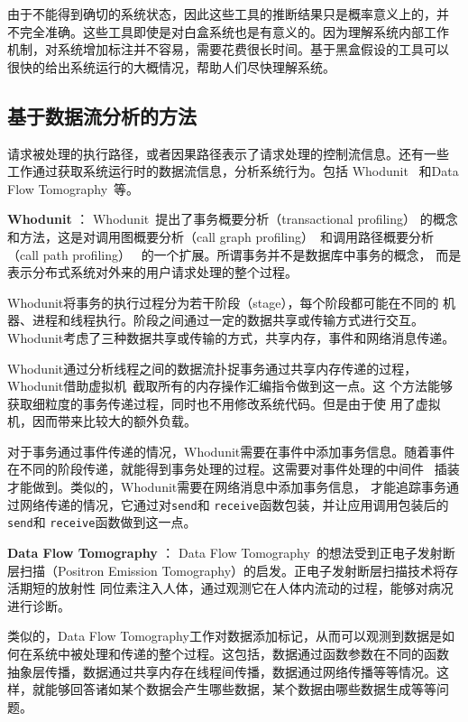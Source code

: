 由于不能得到确切的系统状态，因此这些工具的推断结果只是概率意义上的，并
不完全准确。这些工具即使是对白盒系统也是有意义的。因为理解系统内部工作
机制，对系统增加标注并不容易，需要花费很长时间。基于黑盒假设的工具可以
很快的给出系统运行的大概情况，帮助人们尽快理解系统。

\subsection{基于数据流分析的方法}
\label{related:debug:dataflow}

请求被处理的执行路径，或者因果路径表示了请求处理的控制流信息。还有一些
工作通过获取系统运行时的数据流信息，分析系统行为。包括
Whodunit~\cite{whodunit} 和Data Flow Tomography~\cite{dft}等。

\textbf{Whodunit} ：
Whodunit~\cite{whodunit}提出了事务概要分析（transactional profiling）
的概念和方法，这是对调用图概要分析（call graph
profiling）~\cite{Graham2004}和调用路径概要分析（call path profiling）~
\cite{Hall1992, Hall1993}的一个扩展。所谓事务并不是数据库中事务的概念，
而是表示分布式系统对外来的用户请求处理的整个过程。

Whodunit将事务的执行过程分为若干阶段（stage），每个阶段都可能在不同的
机器、进程和线程执行。阶段之间通过一定的数据共享或传输方式进行交互。
Whodunit考虑了三种数据共享或传输的方式，共享内存，事件和网络消息传递。

Whodunit通过分析线程之间的数据流扑捉事务通过共享内存传递的过程，
Whodunit借助虚拟机~\cite{qemu}截取所有的内存操作汇编指令做到这一点。这
个方法能够获取细粒度的事务传递过程，同时也不用修改系统代码。但是由于使
用了虚拟机，因而带来比较大的额外负载。

对于事务通过事件传递的情况，Whodunit需要在事件中添加事务信息。随着事件
在不同的阶段传递，就能得到事务处理的过程。这需要对事件处理的中间件
~\cite{seda}插装才能做到。类似的，Whodunit需要在网络消息中添加事务信息，
才能追踪事务通过网络传递的情况，它通过对\texttt{send}和
\texttt{receive}函数包装，并让应用调用包装后的\texttt{send}和
\texttt{receive}函数做到这一点。

\textbf{Data Flow Tomography} ：
Data Flow Tomography~\cite{dft}的想法受到正电子发射断层扫描（Positron
Emission Tomography）的启发。正电子发射断层扫描技术将存活期短的放射性
同位素注入人体，通过观测它在人体内流动的过程，能够对病况进行诊断。

类似的，Data Flow Tomography工作对数据添加标记，从而可以观测到数据是如
何在系统中被处理和传递的整个过程。这包括，数据通过函数参数在不同的函数
抽象层传播，数据通过共享内存在线程间传播，数据通过网络传播等等情况。这
样，就能够回答诸如某个数据会产生哪些数据，某个数据由哪些数据生成等等问
题。

